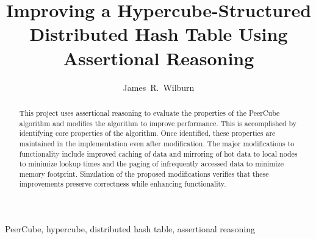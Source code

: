 \documentclass[apa6]{IEEEtran}
\theoremstyle{plain}
\begin{document}
%
\title{Improving a Hypercube-Structured Distributed Hash Table Using Assertional Reasoning}
%
%
%

\author{%
		James~R.~Wilburn%
        }






\maketitle
{}
\datatable

\begin{abstract}
This project uses assertional reasoning to evaluate the properties of the PeerCube\cite{anceaume_peercube:_2008} algorithm and modifies the algorithm to improve performance.  This is accomplished by identifying core properties of the algorithm. Once identified, these properties are maintained in the implementation even after modification. The major modifications to functionality include improved caching of data and mirroring of hot data to local nodes to minimize lookup times and the paging of infrequently accessed data to minimize memory footprint. Simulation of the proposed modifications verifies that these improvements preserve correctness while enhancing functionality.
\end{abstract}

\begin{IEEEkeywords}
PeerCube\cite{anceaume_peercube:_2008}, hypercube, distributed hash table, assertional reasoning
\end{IEEEkeywords}
\end{document}
